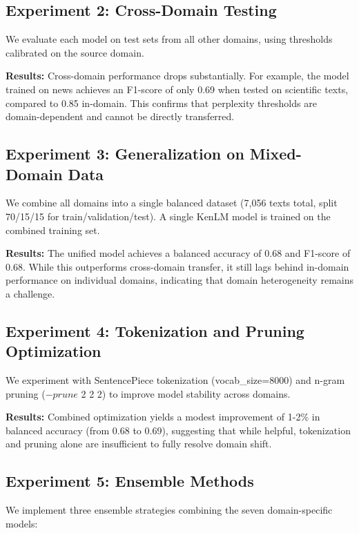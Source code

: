 \documentclass{article}
\begin{document}
\subsection{Experiment 2: Cross-Domain Testing}

We evaluate each model on test sets from all other domains, using thresholds calibrated on the source domain.

\textbf{Results:} Cross-domain performance drops substantially. For example, the model trained on news achieves an F1-score of only 0.69 when tested on scientific texts, compared to 0.85 in-domain. This confirms that perplexity thresholds are domain-dependent and cannot be directly transferred.

\subsection{Experiment 3: Generalization on Mixed-Domain Data}

We combine all domains into a single balanced dataset (7,056 texts total, split 70/15/15 for train/validation/test). A single KenLM model is trained on the combined training set.

\textbf{Results:} The unified model achieves a balanced accuracy of 0.68 and F1-score of 0.68. While this outperforms cross-domain transfer, it still lags behind in-domain performance on individual domains, indicating that domain heterogeneity remains a challenge.

\subsection{Experiment 4: Tokenization and Pruning Optimization}

We experiment with SentencePiece tokenization (vocab\_size=8000) and n-gram pruning ($-prune$ 2 2 2) to improve model stability across domains.

\textbf{Results:} Combined optimization yields a modest improvement of 1-2\% in balanced accuracy (from 0.68 to 0.69), suggesting that while helpful, tokenization and pruning alone are insufficient to fully resolve domain shift.

\subsection{Experiment 5: Ensemble Methods}

We implement three ensemble strategies combining the seven domain-specific models:
\end{document}
